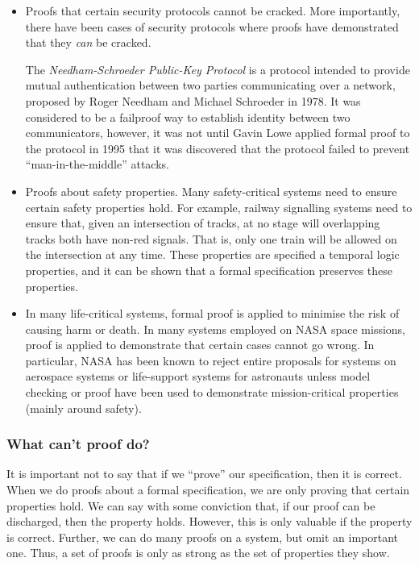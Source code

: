 \begin{itemize}

 \item Proofs that certain security protocols cannot be cracked. More importantly, there have been cases of security protocols where proofs have demonstrated that they \emph{can} be cracked.

 The \emph{Needham-Schroeder Public-Key Protocol} is a protocol intended to provide mutual authentication between two parties communicating over a network, proposed by Roger Needham and Michael Schroeder in 1978. It was considered to be a failproof way to establish identity between two communicators, however, it was not until Gavin Lowe applied formal proof to the protocol in 1995 that it was discovered that the protocol failed to prevent ``man-in-the-middle'' attacks.

 \item Proofs about safety properties. Many safety-critical systems need to ensure certain safety properties hold. For example, railway signalling systems need to ensure that, given an intersection of tracks, at no stage will overlapping tracks both have non-red signals. That is, only one train will be allowed on the intersection at any time. These properties are specified a temporal logic properties, and it can be shown that a formal specification preserves these properties.

 \item In many life-critical systems, formal proof is applied to minimise the risk of causing harm or death. In many systems employed on NASA space missions, proof is applied to demonstrate that certain cases cannot go wrong. In particular, NASA has been known to reject entire proposals for systems on aerospace systems or life-support systems for astronauts unless model checking or proof have been used to demonstrate mission-critical properties (mainly around safety).

\end{itemize}

\subsubsection*{What can't proof do?}

It is important not to say that if we ``prove'' our specification, then it is correct. When we do proofs about a formal specification, we are only proving that certain properties hold. We can say with some conviction that, if our proof can be discharged, then the property holds. However, this is only valuable if the property is correct. Further, we can do many proofs on a system, but omit an important one. Thus, a set of proofs is only as strong as the set of properties they show.

